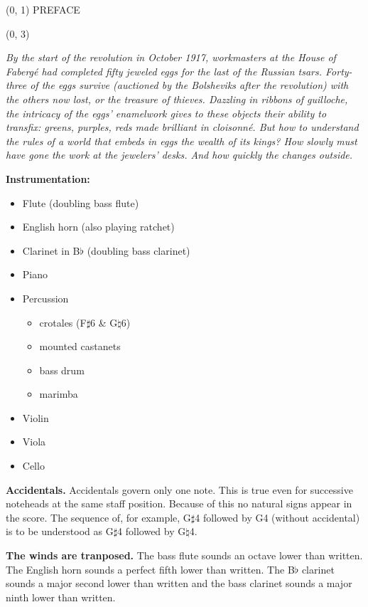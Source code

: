 \documentclass[10pt]{article}
\begin{document}
\begin{textblock}{23}(0, 1)
\center \huge PREFACE
\end{textblock}

\begin{textblock}{23}(0, 3)

\textit{By the start of the revolution in October 1917, workmasters at the
House of Fabergé had completed fifty jeweled eggs for the last of the Russian
tsars. Forty-three of the eggs survive (auctioned by the Bolsheviks after the
revolution) with the others now lost, or the treasure of thieves. Dazzling in
ribbons of guilloche, the intricacy of the eggs' enamelwork gives to these
objects their ability to transfix: greens, purples, reds made brilliant in
cloisonné. But how to understand the rules of a world that embeds in eggs the
wealth of its kings? How slowly must have gone the work at the jewelers' desks.
And how quickly the changes outside.}

\textbf{Instrumentation:}

\begin{itemize} \itemsep2pt
\item Flute (doubling bass flute)
\item English horn (also playing ratchet)
\item Clarinet in B$\flat$ (doubling bass clarinet)
\item Piano
\item Percussion
    \begin{itemize}
    \item crotales (F$\sharp$6 \& G$\natural$6)
    \item mounted castanets
    \item bass drum
    \item marimba
    \end{itemize}
\item Violin
\item Viola
\item Cello
\end{itemize}

\textbf{Accidentals.} Accidentals govern only one note. This is true even for
successive noteheads at the same staff position. Because of this no natural
signs appear in the score. The sequence of, for example, G$\sharp$4 followed by
G4 (without accidental) is to be understood as G$\sharp$4 followed by
G$\natural$4.

\textbf{The winds are tranposed.} The bass flute sounds an octave lower than
written. The English horn sounds a perfect fifth lower than written. The
B$\flat$ clarinet sounds a major second lower than written and the bass
clarinet sounds a major ninth lower than written.


\end{textblock}
\end{document}
